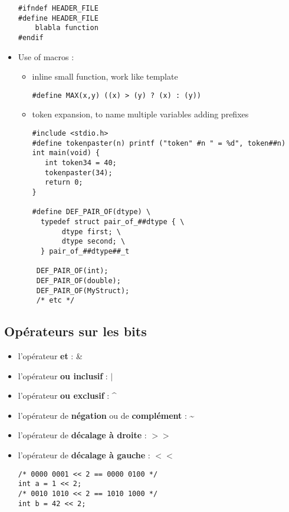 \documentclass[12pt,a4paper]{article}
\begin{document}
\begin{itemize}
\begin{lstlisting}
#ifndef HEADER_FILE
#define HEADER_FILE
	blabla function
#endif
\end{lstlisting}
\item Use of macros : 
\begin{itemize}
\item inline small function, work like template
\begin{lstlisting}
#define MAX(x,y) ((x) > (y) ? (x) : (y))
\end{lstlisting}
\item token expansion, to name multiple variables adding prefixes
\begin{lstlisting}
#include <stdio.h>
#define tokenpaster(n) printf ("token" #n " = %d", token##n)
int main(void) {
   int token34 = 40;
   tokenpaster(34);
   return 0;
}

#define DEF_PAIR_OF(dtype) \
  typedef struct pair_of_##dtype { \
       dtype first; \
       dtype second; \
  } pair_of_##dtype##_t 

 DEF_PAIR_OF(int);
 DEF_PAIR_OF(double);
 DEF_PAIR_OF(MyStruct);
 /* etc */
\end{lstlisting}
\end{itemize}
\end{itemize}

\subsection{Opérateurs sur les bits}
\begin{itemize}
\item l'opérateur \textbf{et} : \&
\item l'opérateur \textbf{ou inclusif} : $|$
\item l'opérateur \textbf{ou exclusif} : \^{}
\item l'opérateur de \textbf{négation} ou de \textbf{complément} : \textasciitilde
\item l'opérateur de \textbf{décalage à droite} : $>>$
\item l'opérateur de \textbf{décalage à gauche} : $<<$
\begin{lstlisting}
/* 0000 0001 << 2 == 0000 0100 */
int a = 1 << 2;
/* 0010 1010 << 2 == 1010 1000 */
int b = 42 << 2;
\end{lstlisting}
\end{itemize}
\end{document}
